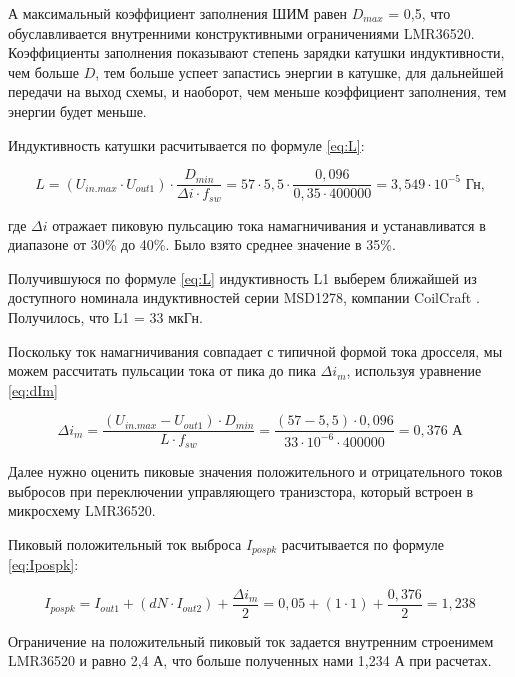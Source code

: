 А максимальный коэффициент заполнения ШИМ равен $D_{max}$ = 0,5, что обуславливается внутренними
конструктивными ограничениями LMR36520. Коэффициенты заполнения показывают степень зарядки 
катушки индуктивности, чем больше $D$, тем больше успеет запастись энергии в катушке, для дальнейшей
передачи на выход схемы, и наоборот, чем меньше коэффициент заполнения, тем энергии будет меньше. 

Индуктивность катушки расчитывается по формуле \ref{eq:L}:

\begin{equation}
    L =
    (U_{in. max} \cdot U_{out1}) \cdot \frac{D_{min}}{\Delta i \cdot f_{sw}} = 
    57 \cdot 5,5 \cdot \frac{0,096}{0,35 \cdot 400000} =
     3,549 \cdot 10^{-5}  \text{ Гн,}
    \label{eq:L}
\end{equation}

где $\Delta i$ отражает пиковую пульсацию тока намагничивания и устанавливатся
в диапазоне от 30\% до 40\%. Было взято среднее значение в 35\%. 

Получившуюся по формуле \ref{eq:L} индуктивность L1 выберем ближайшей из доступного номинала 
индуктивностей серии MSD1278, компании CoilCraft \cite{MSD1278:datasheet}. Получилось, что L1 = 33 мкГн. 

Поскольку ток намагничивания совпадает с типичной формой тока дросселя, мы можем рассчитать пульсации 
тока от пика до пика $\varDelta i_{m}$, используя уравнение \ref{eq:dIm}

\begin{equation}
    \varDelta i_{m} =
    \frac{(U_{in.max} - U_{out1}) \cdot D_{min}}{L \cdot f_{sw}} =
    \frac{(57 - 5,5) \cdot 0,096}{33 \cdot 10^{-6} \cdot 400000} =
    0,376 \text{ А}
    \label{eq:dIm}
\end{equation}

Далее нужно оценить пиковые значения положительного и отрицательного токов выбросов при переключении
управляющего транизстора, который встроен в микросхему LMR36520. 

Пиковый положительный ток выброса $I_{pospk}$ расчитывается по формуле \ref{eq:Ipospk}:

\begin{equation}
    I_{pospk} =
    I_{out1} + (dN \cdot I_{out2}) + \frac{\Delta i_{m}}{2} = 
    0,05 + (1 \cdot 1) + \frac{0,376}{2} =
    1,238
    \label{eq:Ipospk}
\end{equation}

Ограничение на положительный пиковый ток задается внутренним строенимем LMR36520 и равно 2,4 А, что больше
полученных нами 1,234 А при расчетах. 

